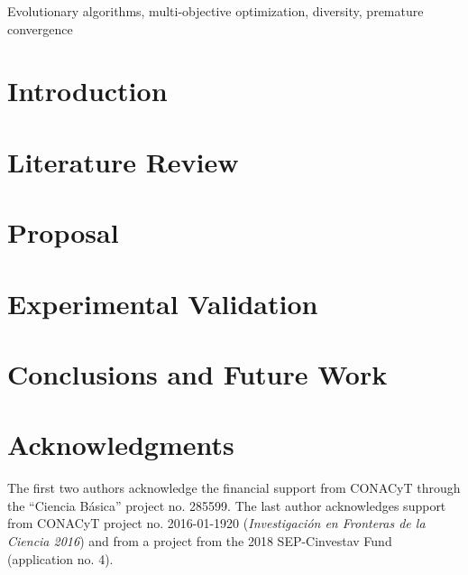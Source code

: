 \documentclass[twoside]{article}
\begin{document}
\begin{keywords}
Evolutionary algorithms,
multi-objective optimization,
diversity,
premature convergence

\end{keywords}

\section{Introduction}



\section{Literature Review}
\label{Sec:LiteratureReview}


\section{Proposal}
\label{Sec:Proposal}


\section{Experimental Validation}
\label{Sec:ExperimentalValidation}


\section{Conclusions and Future Work}
\label{Sec:Conclusion}


\section*{Acknowledgments}
The first two authors acknowledge the financial support from CONACyT through the ``Ciencia B\'asica'' project no. 285599.
The last author acknowledges support from CONACyT 
project no. 2016-01-1920 ({\em Investigaci\'{o}n en Fronteras de la Ciencia 2016})
and from a project from the 2018 SEP-Cinvestav Fund (application no. 4).


\small



\end{document}
